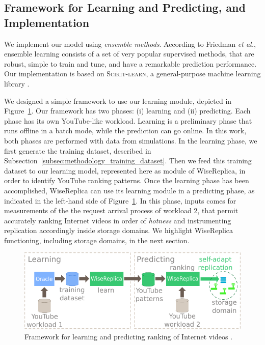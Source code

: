 \subsection{Framework for Learning and Predicting, and Implementation}
\label{subsec:framework}

We implement our model using \emph{ensemble methods}. According to Friedman \emph{et al.}, ensemble learning consists of a set of very popular supervised methods, that are robust, simple to train and tune, and have a remarkable prediction performance. Our implementation is based on \textsc{Scikit-learn}, a general-purpose machine learning library \cite{scikit-learn}. 

We designed a simple framework to use our learning module, depicted in Figure~\ref{fig:model_scenario}. Our framework has two phases: (i) learning and (ii) predicting. Each phase has its own YouTube-like workload. Learning is a preliminary phase that runs offline in a batch mode, while the prediction can go online. In this work, both phases are performed with data from simulations. In the learning phase, we first generate the training dataset, described in Subsection~\ref{subsec:methodology_training_dataset}. Then we feed this training dataset to our learning model, represented here as module of WiseReplica, in order to identify YouTube ranking patterns. Once the learning phase has been accomplished, WiseReplica can use its learning module in a predicting phase, as indicated in the left-hand side of Figure~\ref{fig:model_scenario}. In this phase, inputs comes for measurements of the the request arrival process of workload 2, that permit accurately ranking Internet videos in order of \emph{hotness} and instrumenting replication accordingly inside storage domains. We highlight WiseReplica functioning, including storage domains, in the next section.

\begin{figure}
  \centering
     \includegraphics[width=.65\textwidth]{inputs/img/wisereplica_scheme}
  \caption{Framework for learning and predicting ranking of Internet videos .}
  \label{fig:model_scenario}
\end{figure}
